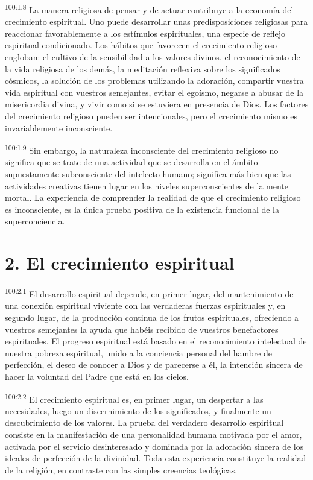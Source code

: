 \par
\textsuperscript{100:1.8} La manera religiosa de pensar y de actuar contribuye a la economía del crecimiento espiritual. Uno puede desarrollar unas predisposiciones religiosas para reaccionar favorablemente a los estímulos espirituales, una especie de reflejo espiritual condicionado. Los hábitos que favorecen el crecimiento religioso engloban: el cultivo de la sensibilidad a los valores divinos, el reconocimiento de la vida religiosa de los demás, la meditación reflexiva sobre los significados cósmicos, la solución de los problemas utilizando la adoración, compartir vuestra vida espiritual con vuestros semejantes, evitar el egoísmo, negarse a abusar de la misericordia divina, y vivir como si se estuviera en presencia de Dios. Los factores del crecimiento religioso pueden ser intencionales, pero el crecimiento mismo es invariablemente inconsciente.

\par
\textsuperscript{100:1.9} Sin embargo, la naturaleza inconsciente del crecimiento religioso no significa que se trate de una actividad que se desarrolla en el ámbito supuestamente subconsciente del intelecto humano; significa más bien que las actividades creativas tienen lugar en los niveles superconscientes de la mente mortal. La experiencia de comprender la realidad de que el crecimiento religioso es inconsciente, es la única prueba positiva de la existencia funcional de la superconciencia.

\section*{2. El crecimiento espiritual}
\par
\textsuperscript{100:2.1} El desarrollo espiritual depende, en primer lugar, del mantenimiento de una conexión espiritual viviente con las verdaderas fuerzas espirituales y, en segundo lugar, de la producción continua de los frutos espirituales, ofreciendo a vuestros semejantes la ayuda que habéis recibido de vuestros benefactores espirituales. El progreso espiritual está basado en el reconocimiento intelectual de nuestra pobreza espiritual, unido a la conciencia personal del hambre de perfección, el deseo de conocer a Dios y de parecerse a él, la intención sincera de hacer la voluntad del Padre que está en los cielos.

\par
\textsuperscript{100:2.2} El crecimiento espiritual es, en primer lugar, un despertar a las necesidades, luego un discernimiento de los significados, y finalmente un descubrimiento de los valores. La prueba del verdadero desarrollo espiritual consiste en la manifestación de una personalidad humana motivada por el amor, activada por el servicio desinteresado y dominada por la adoración sincera de los ideales de perfección de la divinidad. Toda esta experiencia constituye la realidad de la religión, en contraste con las simples creencias teológicas.

